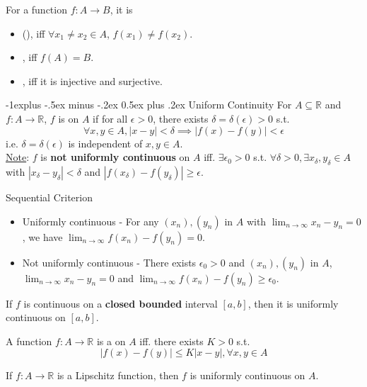 \documentclass[10pt,landscape,letterpaper]{article}
\makeatletter
\renewcommand{\subsection}{\@startsection{subsection}{2}{0mm}%
                                {-1explus -.5ex minus -.2ex}%
                                {0.5ex plus .2ex}%
                                {\sffamily\normalsize\itshape}}
\makeatother
\begin{document}
\begin{multicols}{3}
\smallbreak


For a function $f: A \to B$, it is
\begin{itemize}
    \item {} (), iff $\forall x_1 \neq x_2 \in A$, $f(x_1) \neq f(x_2)$.
    \item {}, iff $f(A) = B$.
    \item {}, iff it is injective and surjective.
\end{itemize}





\subsection{Uniform Continuity}
For $A \subseteq \mathbb{R}$ and $f: A \to \mathbb{R}$, $f$ is  on $A$ if for all  $\epsilon > 0$, there exists $\delta = \delta(\epsilon) > 0$ s.t.
\[
\forall x, y \in A, |x-y| < \delta \implies |f(x) - f(y)| < \epsilon
\]
i.e. $\delta = \delta(\epsilon)$ is independent of $x, y \in A$.
\\
\underline{Note}: $f$ is \textbf{not uniformly continuous} on $A$ iff. $\exists \epsilon_0 > 0$ s.t. $\forall \delta > 0, \exists x_\delta, y_\delta \in A$ with $|x_\delta - y_\delta| < \delta$ and $|f(x_\delta) - f(y_\delta)| \ge \epsilon$.

Sequential Criterion
\begin{itemize}
    \item Uniformly continuous - For any $(x_n), (y_n)$ in $A$ with $\lim_{n\to \infty} x_n - y_n = 0$, we have $\lim_{n \to \infty} f(x_n) - f(y_n) = 0$.
    \item Not uniformly continuous - There exists $\epsilon_0 > 0$ and $(x_n), (y_n)$ in $A$, $\lim_{n\to \infty} x_n - y_n = 0$ and $\lim_{n \to \infty} f(x_n) - f(y_n) \ge \epsilon_0$.
\end{itemize}


 If $f$ is continuous on a \textbf{closed bounded} interval $[a, b]$, then it is uniformly continuous on $[a, b]$.


\smallbreak


A function $f: A \to \mathbb{R}$ is a  on $A$ iff. there exists $K > 0$ s.t.
\[
|f(x) - f(y)| \le K |x-y|, \forall x, y \in A
\]

 If $f: A \to \mathbb{R}$ is a Lipschitz function, then $f$ is uniformly continuous on $A$.



\end{multicols}
\end{document}
